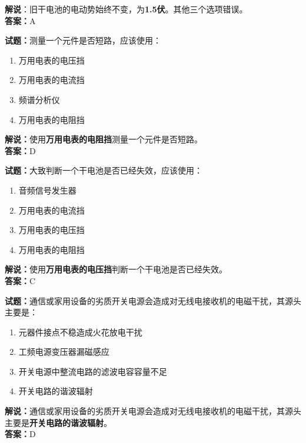 \documentclass{ctexbook}
\begin{document}
\noindent\textbf{解说}：旧干电池的电动势始终不变，为\textbf{1.5伏}。其他三个选项错误。\\\noindent\textbf{答案：}A

\bigskip


\noindent\textbf{试题：}测量一个元件是否短路，应该使用：

\begin{enumerate}[leftmargin=3em]
	\item 万用电表的电压挡
	\item 万用电表的电流挡
	\item 频谱分析仪
	\item 万用电表的电阻挡
\end{enumerate}

\noindent\textbf{解说：}使用\textbf{万用电表的电阻挡}测量一个元件是否短路。\\\noindent\textbf{答案：}D

\bigskip


\noindent\textbf{试题：}大致判断一个干电池是否已经失效，应该使用：

\begin{enumerate}[leftmargin=3em]
	\item 音频信号发生器
	\item 万用电表的电流挡
	\item 万用电表的电压挡
	\item 万用电表的电阻挡
\end{enumerate}

\noindent\textbf{解说：}使用\textbf{万用电表的电压挡}判断一个干电池是否已经失效。\\\noindent\textbf{答案：}C

\bigskip


\noindent\textbf{试题：}通信或家用设备的劣质开关电源会造成对无线电接收机的电磁干扰，其源头主要是：

\begin{enumerate}[leftmargin=3em]
	\item 元器件接点不稳造成火花放电干扰
	\item 工频电源变压器漏磁感应
	\item 开关电源中整流电路的滤波电容容量不足
	\item 开关电路的谐波辐射
\end{enumerate}

\noindent\textbf{解说：}通信或家用设备的劣质开关电源会造成对无线电接收机的电磁干扰，其源头主要是\textbf{开关电路的谐波辐射}。\\\noindent\textbf{答案：}D
\end{document}
